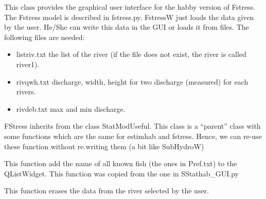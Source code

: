 \documentclass[letterpaper,10pt,english]{sphinxmanual}
\begin{document}
\begin{fulllineitems}
\label{\detokenize{index:src_GUI.fstress_GUI.FstressW}}
This class provides the graphical user interface for the habby version of Fstress. The Fstress model is described in
fstress.py. FstressW just loads the data given by the user. He/She can write this data in the GUI or loads it
from files. The following files are needed:
\begin{itemize}
\item {} 
listriv.txt the list of the river (if the file does not exist, the river is called river1).

\item {} 
rivqwh.txt discharge, width, height for two discharge (measured) for each rivers.

\item {} 
rivdeb.txt max and min discharge.

\end{itemize}

FStress inherits from the class StatModUseful. This class is a ``parent'' class with some functions which are the same
for estimhab and fstress. Hence, we can re-use these function without re.writing them (a bit like SubHydroW)

\begin{fulllineitems}
\label{\detokenize{index:src_GUI.fstress_GUI.FstressW.add_all_fish}}
This function add the name of all known fish (the ones in Pref.txt) to the QListWidget. This function
was copied from the one in SStathab\_GUI.py

\end{fulllineitems}


\begin{fulllineitems}
\label{\detokenize{index:src_GUI.fstress_GUI.FstressW.erase_name}}
This function erases the data from the river selected by the user.

\end{fulllineitems}



\end{fulllineitems}
\end{document}
